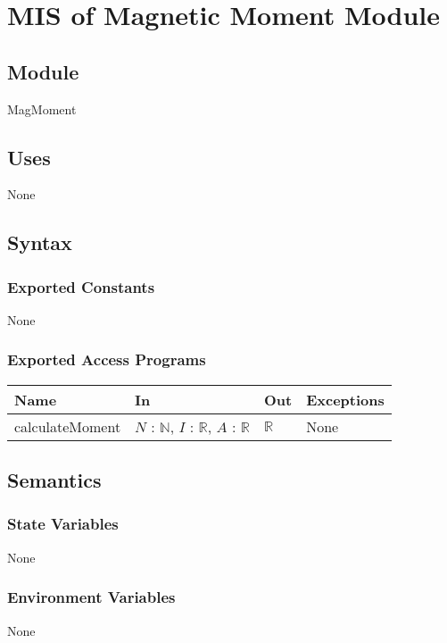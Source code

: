 \documentclass[12pt, titlepage]{article}
\begin{document}
\newpage


\section{MIS of Magnetic Moment Module} \label{MISMagMoment}
\subsection{Module}
MagMoment

\subsection{Uses}
None

\subsection{Syntax}

\subsubsection{Exported Constants}
None

\subsubsection{Exported Access Programs}
\begin{center}
\begin{tabular}{p{3cm} p{4cm} p{4cm} p{3cm}}
\hline
\textbf{Name} & \textbf{In} & \textbf{Out} & \textbf{Exceptions} \\
\hline
calculateMoment & $N$ : $\mathbb{N}$, $I$ : $\mathbb{R}$, $A$ : $\mathbb{R}$  & $\mathbb{R}$ & None \\
\hline
\end{tabular}
\end{center}

\subsection{Semantics}

\subsubsection{State Variables}
None

\subsubsection{Environment Variables}
None
\end{document}
